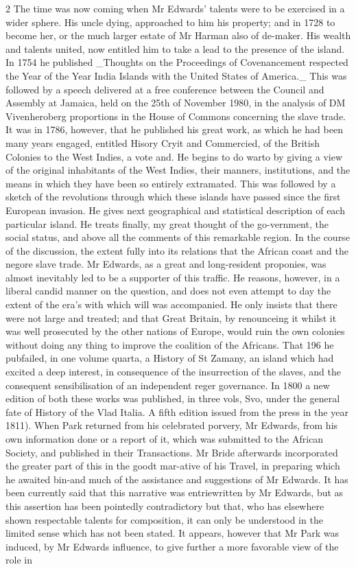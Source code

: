 \documentclass[10pt]{article}
\begin{document}
\begin{multicols}{2}
The time was now coming when Mr Edwards’ talents were to be exercised in a wider sphere. His uncle dying, approached to him his property; and in 1728 to become her, or the much larger estate of Mr Harman also of de-maker. His wealth and talents united, now entitled him to take a lead to the presence of the island. In 1754 he published \_Thoughts on the Proceedings of Covenancement respected the Year of the Year India Islands with the United States of America.\_ This was followed by a speech delivered at a free conference between the Council and Assembly at Jamaica, held on the 25th of November 1980, in the analysis of DM Vivenheroberg proportions in the House of Commons concerning the slave trade. It was in 1786, however, that he published his great work, as which he had been many years engaged, entitled Hisory Cryit and Commercied, of the British Colonies to the West Indies, a vote and. He begins to do warto by giving a view of the original inhabitants of the West Indies, their manners, institutions, and the means in which they have been so entirely extramated. This was followed by a sketch of the revolutions through which these islands have passed since the first European invasion. He gives next geographical and statistical description of each particular island. He treats finally, my great thought of the go-vernment, the social status, and above all the comments of this remarkable region. In the course of the discussion, the extent fully into its relations that the African coast and the negore slave trade. Mr Edwards, as a great and long-resident proponies, was almost inevitably led to be a supporter of this traffic. He reasons, however, in a liberal candid manner on the question, and does not even attempt to day the extent of the era's with which will was accompanied. He only insists that there were not large and treated; and that Great Britain, by renounceing it whilst it was well prosecuted by the other nations of Europe, would ruin the own colonies without doing any thing to improve the coalition of the Africans. That 196 he pubfailed, in one volume quarta, a History of St Zamany, an island which had excited a deep interest, in consequence of the insurrection of the slaves, and the consequent sensibilisation of an independent reger governance. In 1800 a new edition of both these works was published, in three vols, Svo, under the general fate of History of the Vlad Italia. A fifth edition issued from the press in the year 1811). When Park returned from his celebrated porvery, Mr Edwards, from his own information done or a report of it, which was submitted to the African Society, and published in their Transactions. Mr Bride afterwards incorporated the greater part of this in the goodt mar-ative of his Travel, in preparing which he awaited bin-and much of the assistance and suggestions of Mr Edwards. It has been currently said that this narrative was entriewritten by Mr Edwards, but as this assertion has been pointedly contradictory but that, who has elsewhere shown respectable talents for composition, it can only be understood in the limited sense which has not been stated. It appears, however that Mr Park was induced, by Mr Edwards influence, to give further a more favorable view of the role in 
\end{multicols}
\end{document}
